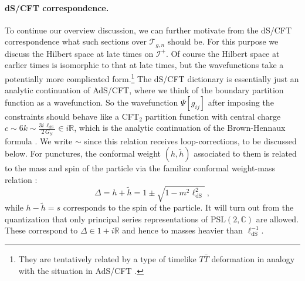 \documentclass[12pt,a4paper]{article}
\newcommand{\be}{\begin{equation}}
\newcommand{\ee}{\end{equation}}
\newcommand\PSL{\text{PSL}}
\newcommand\CC{\mathbb{C}}
\newcommand\RR{\mathbb{R}}
\begin{document}
\paragraph{dS/CFT correspondence.} To continue our overview discussion, we can further motivate from the dS/CFT correspondence what such sections over $\mathcal{T}
_{g,n}$ should be. For this purpose we discuss the Hilbert space at late times on $\mathcal{I}^+$. Of course the Hilbert space at earlier times is isomorphic to that at late times, but the wavefunctions take a potentially more complicated form.\footnote{They are tentatively related by a type of timelike $T\bar{T}$ deformation in analogy with the situation in AdS/CFT \cite{McGough:2016lol, Araujo-Regado:2022gvw}.} The dS/CFT dictionary is essentially just an analytic continuation of AdS/CFT, where we think of the boundary partition function as a wavefunction. So the wavefunction $\Psi[g_{ij}]$ after imposing the constraints should behave like a CFT$_2$ partition function with central charge $c\sim 6k \sim \frac{3i \, \ell_{\text{dS}}}{2 \, G_\text{N}} \in i \RR$, which is the analytic continuation of the Brown-Hennaux formula \cite{Brown:1986nw}. We write $\sim$ since this relation receives loop-corrections, to be discussed below. For punctures, the conformal weight $(h,\tilde{h})$ associated to them is related to the mass and spin of the particle via the familiar conformal weight-mass relation \cite{Strominger:2001pn}:
\be 
\Delta=h+\tilde{h}=1 \pm \sqrt{1-m^2 \ell^2_\text{dS}}~, \label{eq:conformal weight mass}
\ee
while $h-\tilde{h}=s$ corresponds to the spin of the particle.
It will turn out from the quantization that only principal series representations of $\PSL(2,\CC)$ are allowed. These correspond to $\Delta \in 1+i \RR$ and hence to masses heavier than $\ell_\text{dS}^{-1}$. 
\end{document}
